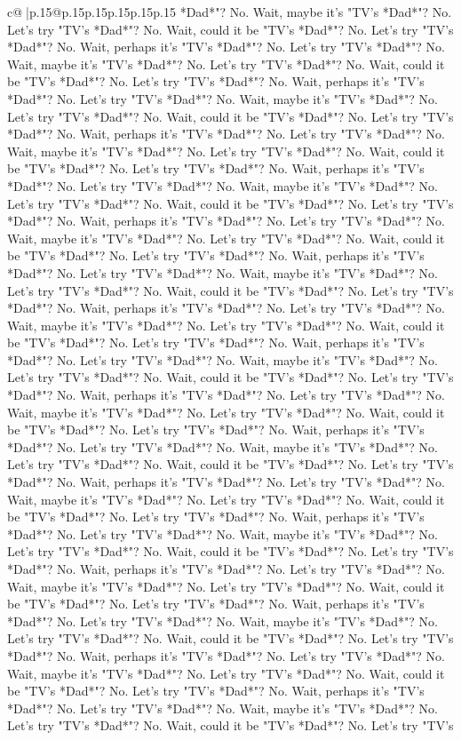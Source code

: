 \documentclass{article}
\begin{document}
{\begin{supertabular}{c@{$\;$}|p{.15\linewidth}@{}p{.15\linewidth}p{.15\linewidth}p{.15\linewidth}p{.15\linewidth}p{.15\linewidth}}
{{{*Dad*"? No. Wait, maybe it's "TV's *Dad*"? No. Let's try "TV's *Dad*"? No. Wait, could it be "TV's *Dad*"? No. Let's try "TV's *Dad*"? No. Wait, perhaps it's "TV's *Dad*"? No. Let's try "TV's *Dad*"? No. Wait, maybe it's "TV's *Dad*"? No. Let's try "TV's *Dad*"? No. Wait, could it be "TV's *Dad*"? No. Let's try "TV's *Dad*"? No. Wait, perhaps it's "TV's *Dad*"? No. Let's try "TV's *Dad*"? No. Wait, maybe it's "TV's *Dad*"? No. Let's try "TV's *Dad*"? No. Wait, could it be "TV's *Dad*"? No. Let's try "TV's *Dad*"? No. Wait, perhaps it's "TV's *Dad*"? No. Let's try "TV's *Dad*"? No. Wait, maybe it's "TV's *Dad*"? No. Let's try "TV's *Dad*"? No. Wait, could it be "TV's *Dad*"? No. Let's try "TV's *Dad*"? No. Wait, perhaps it's "TV's *Dad*"? No. Let's try "TV's *Dad*"? No. Wait, maybe it's "TV's *Dad*"? No. Let's try "TV's *Dad*"? No. Wait, could it be "TV's *Dad*"? No. Let's try "TV's *Dad*"? No. Wait, perhaps it's "TV's *Dad*"? No. Let's try "TV's *Dad*"? No. Wait, maybe it's "TV's *Dad*"? No. Let's try "TV's *Dad*"? No. Wait, could it be "TV's *Dad*"? No. Let's try "TV's *Dad*"? No. Wait, perhaps it's "TV's *Dad*"? No. Let's try "TV's *Dad*"? No. Wait, maybe it's "TV's *Dad*"? No. Let's try "TV's *Dad*"? No. Wait, could it be "TV's *Dad*"? No. Let's try "TV's *Dad*"? No. Wait, perhaps it's "TV's *Dad*"? No. Let's try "TV's *Dad*"? No. Wait, maybe it's "TV's *Dad*"? No. Let's try "TV's *Dad*"? No. Wait, could it be "TV's *Dad*"? No. Let's try "TV's *Dad*"? No. Wait, perhaps it's "TV's *Dad*"? No. Let's try "TV's *Dad*"? No. Wait, maybe it's "TV's *Dad*"? No. Let's try "TV's *Dad*"? No. Wait, could it be "TV's *Dad*"? No. Let's try "TV's *Dad*"? No. Wait, perhaps it's "TV's *Dad*"? No. Let's try "TV's *Dad*"? No. Wait, maybe it's "TV's *Dad*"? No. Let's try "TV's *Dad*"? No. Wait, could it be "TV's *Dad*"? No. Let's try "TV's *Dad*"? No. Wait, perhaps it's "TV's *Dad*"? No. Let's try "TV's *Dad*"? No. Wait, maybe it's "TV's *Dad*"? No. Let's try "TV's *Dad*"? No. Wait, could it be "TV's *Dad*"? No. Let's try "TV's *Dad*"? No. Wait, perhaps it's "TV's *Dad*"? No. Let's try "TV's *Dad*"? No. Wait, maybe it's "TV's *Dad*"? No. Let's try "TV's *Dad*"? No. Wait, could it be "TV's *Dad*"? No. Let's try "TV's *Dad*"? No. Wait, perhaps it's "TV's *Dad*"? No. Let's try "TV's *Dad*"? No. Wait, maybe it's "TV's *Dad*"? No. Let's try "TV's *Dad*"? No. Wait, could it be "TV's *Dad*"? No. Let's try "TV's *Dad*"? No. Wait, perhaps it's "TV's *Dad*"? No. Let's try "TV's *Dad*"? No. Wait, maybe it's "TV's *Dad*"? No. Let's try "TV's *Dad*"? No. Wait, could it be "TV's *Dad*"? No. Let's try "TV's *Dad*"? No. Wait, perhaps it's "TV's *Dad*"? No. Let's try "TV's *Dad*"? No. Wait, maybe it's "TV's *Dad*"? No. Let's try "TV's *Dad*"? No. Wait, could it be "TV's *Dad*"? No. Let's try "TV's *Dad*"? No. Wait, perhaps it's "TV's *Dad*"? No. Let's try "TV's *Dad*"? No. Wait, maybe it's "TV's *Dad*"? No. Let's try "TV's *Dad*"? No. Wait, could it be "TV's *Dad*"? No. Let's try "TV's *Dad*"? No. Wait, perhaps it's "TV's *Dad*"? No. Let's try "TV's *Dad*"? No. Wait, maybe it's "TV's *Dad*"? No. Let's try "TV's *Dad*"? No. Wait, could it be "TV's *Dad*"? No. Let's try "TV's }}}
\end{supertabular}}
\end{document}
